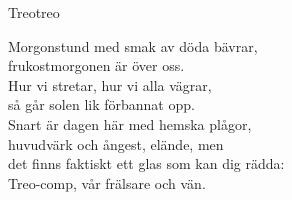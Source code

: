 \begin{song}{Treo}{treo}
\begin{vers}
Morgonstund med smak av döda bävrar,\\
frukostmorgonen är över oss.\\
Hur vi stretar, hur vi alla vägrar,\\
så går solen lik förbannat opp.\\
Snart är dagen här med hemska plågor,\\
huvudvärk och ångest, elände, men\\
det finns faktiskt ett glas som kan dig rädda:\\
Treo-comp, vår frälsare och vän.\\
\end{vers}
\end{song}
